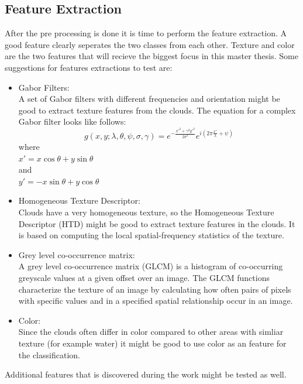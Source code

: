 \documentclass{article}
\begin{document}
\subsection{Feature Extraction}
After the pre processing is done it is time to perform the feature extraction. A good feature clearly seperates the two classes from each other. Texture and color are the two features that will recieve the biggest focus in this master thesis. Some suggestions for features extractions to test are:

\begin{itemize}
\item Gabor Filters: \\
A set of Gabor filters with different frequencies and orientation might be good to extract  texture features from the clouds.
The equation for a complex Gabor filter looks like follows:
\begin{equation}
g(x, y; \lambda, \theta, \psi, \sigma, \gamma) = e^{-\frac{x'^2 + \gamma^2y'^2}{2\sigma^2}}e^{i(2\pi\frac{x'}{\lambda} + \psi)}
\end{equation}
where \\
$x' = x\cos\theta + y\sin\theta$ \\
and \\
$y' = -x\sin\theta + y\cos\theta$

\item Homogeneous Texture Descriptor: \\
Clouds have a very homogeneous texture, so the Homogeneous Texture Descriptor (HTD) might be good to extract texture features in the clouds. It is based on computing the local spatial-frequency statistics of the texture.

\item Grey level co-occurrence matrix: \\
A grey level co-occurrence matrix (GLCM) is a histogram of co-occurring greyscale values at a given offset over an image. The GLCM functions characterize the texture of an image by calculating how often pairs of pixels with specific values and in a specified spatial relationship occur in an image.

\item Color: \\
Since the clouds often differ in color compared to other areas with simliar texture (for example water) it might be good to use color as an feature for the classification. 
\end{itemize}
Additional features that is discovered during the work might be tested as well.
\end{document}
